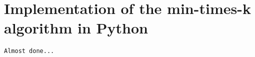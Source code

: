\documentclass[a4paper]{article}
\begin{document}
\section{Implementation of the min-times-k algorithm in Python}

\verb!Almost done...!


\begin{comment}
\begin{algorithm}

\begin{algorithmic}[1]%
  \Procedure{Euclid}{$a,b$}
  \State $r\gets a\bmod b$
  \While{$r\not=0$}
    \State $a\gets b$
    \State $b\gets r$
    \State $r\gets a\bmod b$
  \EndWhile\label{euclidendwhile}
  \State \textbf{return} $b$
  \EndProcedure
\end{algorithmic}
\caption{Just some example I found}

\end{algorithm}
\end{comment}
\end{document}
